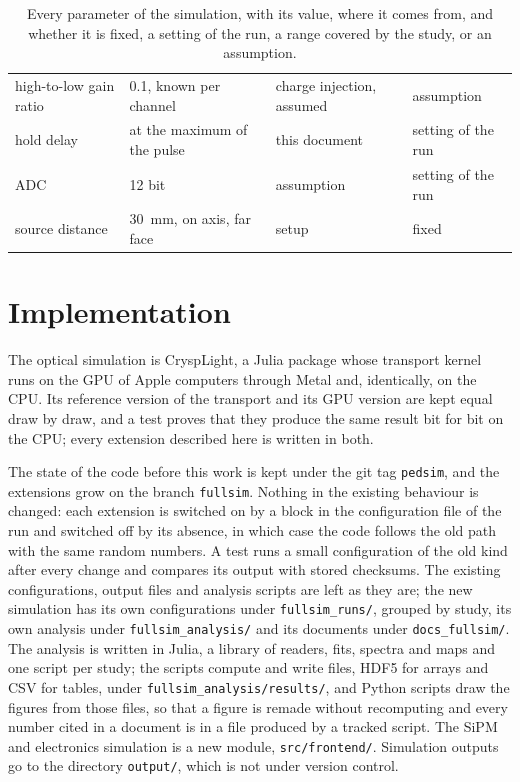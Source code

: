 \documentclass[11pt]{article}
\newcommand{\code}[1]{\texttt{#1}}
\begin{document}
\begin{table}[htb]
\begin{tabular}{p{} p{} p{} p{}}
high-to-low gain ratio & 0.1, known per channel & charge injection, assumed & assumption \\
hold delay & at the maximum of the pulse & this document & setting of the run \\
ADC & 12 bit & assumption & setting of the run \\
source distance & 30~mm, on axis, far face & setup & fixed \\
\bottomrule
\end{tabular}
\caption{Every parameter of the simulation, with its value, where it comes
from, and whether it is fixed, a setting of the run, a range covered by the
study, or an assumption.}
\label{tab:params}
\end{table}

\section{Implementation}
\label{sec:implementation}

The optical simulation is CryspLight, a Julia package whose transport
kernel runs on the GPU of Apple computers through Metal and, identically, on
the CPU. Its reference version of the transport and its GPU version are kept
equal draw by draw, and a test proves that they produce the same result bit
for bit on the CPU; every extension described here is written in both.

The state of the code before this work is kept under the git tag
\code{pedsim}, and the extensions grow on the branch \code{fullsim}. Nothing
in the existing behaviour is changed: each extension is switched on by a
block in the configuration file of the run and switched off by its absence,
in which case the code follows the old path with the same random numbers. A
test runs a small configuration of the old kind after every change and
compares its output with stored checksums. The existing configurations,
output files and analysis scripts are left as they are; the new simulation
has its own configurations under \code{fullsim\_runs/}, grouped by
study, its own analysis under \code{fullsim\_analysis/} and
its documents under \code{docs\_fullsim/}. The analysis is written in Julia,
a library of readers, fits, spectra and maps and one script per study; the
scripts compute and write files, HDF5 for arrays and CSV for tables, under
\code{fullsim\_analysis/results/}, and Python scripts draw the figures from
those files, so that a figure is remade without recomputing and every
number cited in a document is in a file produced by a tracked script. The SiPM and electronics
simulation is a new module, \code{src/frontend/}. Simulation outputs go to
the directory \code{output/}, which is not under version control.
\end{document}
